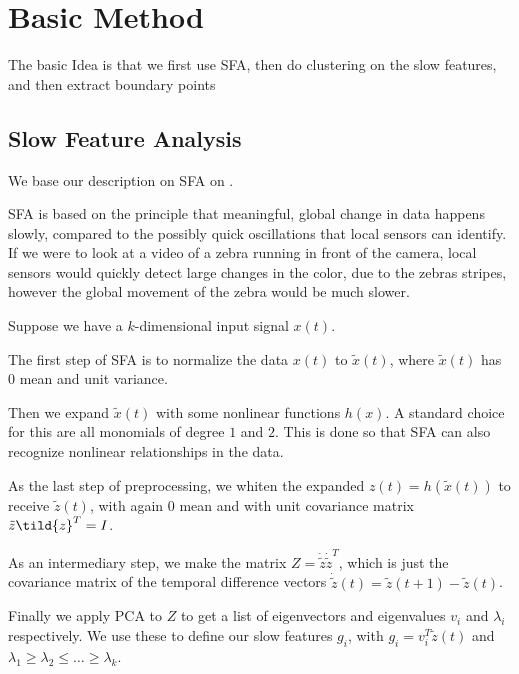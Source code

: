 \section{Basic Method}
The basic Idea is that we first use SFA, then do clustering on the slow features, and then extract boundary points
\subsection{Slow Feature Analysis}
We base our description on SFA on .

SFA is based on the principle that meaningful, global change in data happens slowly, compared to the possibly quick oscillations that local sensors can identify. If we were to look at a video of a zebra running in front of the camera, local sensors would quickly detect large changes in the color, due to the zebras stripes, however the global movement of the zebra would be much slower.


Suppose we have a $k$-dimensional input signal $x(t)$.

The first step of SFA is to normalize the data $x(t)$ to $\tilde{x}(t)$, where $\tilde{x}(t)$ has $0$ mean and unit variance.

Then we expand $\tilde{x}(t)$ with some nonlinear functions $h(x)$. A standard choice for this are all monomials of degree $1$ and $2$. This is done so that SFA can also recognize nonlinear relationships in the data.

As the last step of preprocessing, we whiten the expanded $z(t)=h(\tilde{x}(t))$ to receive $\tilde{z}(t)$, with again $0$ mean and with unit covariance matrix $\tilde{z}\tild{z}^T=I$. 

As an intermediary step, we make the matrix $Z=\dot{\tilde{z}}\dot{\tilde{z}}^T$, which is just the covariance matrix of the temporal difference vectors $\dot{\tilde{z}}(t)=\tilde{z}(t+1)-\tilde{z}(t)$.

Finally we apply PCA  to $Z$ to get a list of eigenvectors and eigenvalues $v_i$ and $\lambda_i$ respectively. We use these to define our slow features $g_i$, with $g_i=v_i^T\tilde{z}(t)$ and $\lambda_1 \geq \lambda _2 \leq \ldots \geq \lambda_k$. 

